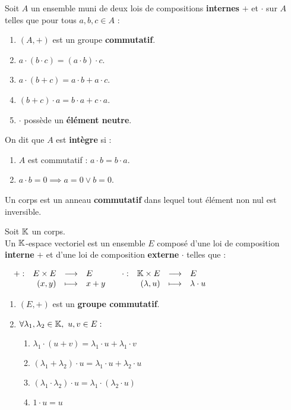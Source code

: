 \begin{definition}
	Soit $A$ un ensemble muni de deux lois de compositions \textbf{internes} \og $+$ \fg et \og $\cdot$ \fg sur $A$ telles que pour tous $a, b, c \in A$ : 
	\begin{enumerate}
			\item $(A, +)$ est un groupe \textbf{commutatif}.
			\item $a \cdot (b \cdot c) = (a \cdot b) \cdot c$.
			\item $a \cdot (b + c) = a \cdot b + a \cdot c$.
			\item $(b + c) \cdot a = b \cdot a + c \cdot a$.
			\item \og $\cdot$ \fg possède un \textbf{élément neutre}.
		\end{enumerate}
	\noindent On dit que $A$ est \textbf{intègre} si :
	\begin{enumerate}
			\item $A$ est commutatif : $a \cdot b = b \cdot a$.
			\item $a \cdot b = 0 \implies a = 0 \lor b = 0$.
		\end{enumerate}
\end{definition}

\begin{definition}
    Un corps est un anneau \textbf{commutatif} dans lequel tout élément non nul est inversible.
\end{definition}

\begin{definition}
	Soit $\mathbb{K}$ un corps. 
	\\
	Un $\mathbb{K}$-espace vectoriel est un ensemble $E$ composé d'une loi de composition \textbf{interne} \og $+$ \fg et d'une loi de composition \textbf{externe} \og $\cdot$ \fg telles que :
	\begin{center}
		$
		\begin{array}{cc}
			\begin{array}{rrcl} + : & E \times E & \longrightarrow & E \\ & (x,y) & \longmapsto & x+y \end{array}
			&
			\begin{array}{rrcl} \cdot : & \mathbb{K} \times E & \longrightarrow & E \\ & (\lambda, u) & \longmapsto & \lambda \cdot u \end{array}
		\end{array}
		$	
	\end{center}		
	
	\begin{enumerate}
		\item $(E, +)$ est un \textbf{groupe commutatif}.
		\item $\forall \lambda_1, \lambda_2 \in \K,\ u, v \in E :$
		\begin{enumerate}
			\item $\lambda_1 \cdot (u + v) = \lambda_1 \cdot u + \lambda_1 \cdot v$
			\item $(\lambda_1 + \lambda_2) \cdot u = \lambda_1 \cdot u + \lambda_2 \cdot u$
			\item $(\lambda_1 \cdot \lambda_2) \cdot u = \lambda_1 \cdot (\lambda_2 \cdot u)$
			\item $1 \cdot u = u$
		\end{enumerate}
	\end{enumerate}
\end{definition}

